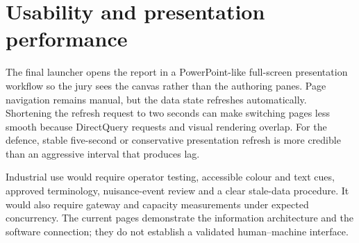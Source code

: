 \section{Usability and presentation performance}

The final launcher opens the report in a PowerPoint-like full-screen presentation workflow so the jury sees the canvas rather than the authoring panes. Page navigation remains manual, but the data state refreshes automatically. Shortening the refresh request to two seconds can make switching pages less smooth because DirectQuery requests and visual rendering overlap. For the defence, stable five-second or conservative presentation refresh is more credible than an aggressive interval that produces lag.

Industrial use would require operator testing, accessible colour and text cues, approved terminology, nuisance-event review and a clear stale-data procedure. It would also require gateway and capacity measurements under expected concurrency. The current pages demonstrate the information architecture and the software connection; they do not establish a validated human--machine interface.
